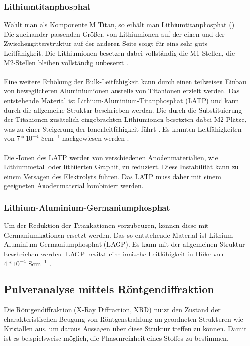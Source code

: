 \documentclass[a4paper, 11pt, headsepline,footsepline,twoside,abstract]{scrbook}
\begin{document}
\subsubsection{Lithiumtitanphosphat}
Wählt man als Komponente M Titan, so erhält man Lithiumtitanphosphat (). Die zueinander passenden Größen von Lithiumionen auf der einen und der Zwischengitterstruktur auf der anderen Seite sorgt für eine sehr gute Leitfähigkeit. Die Lithiumionen besetzen dabei vollständig die M1-Stellen, die M2-Stellen bleiben vollständig unbesetzt \cite{cao2014recent}. 
\\\\
Eine weitere Erhöhung der Bulk-Leitfähigkeit kann durch einen teilweisen Einbau von beweglicheren Aluminiumionen anstelle von Titanionen erzielt werden. Das entstehende Material ist Lithium-Aluminium-Titanphosphat (LATP) und kann durch die allgemeine Struktur  beschrieben werden. Die durch die Substituierung der Titanionen zusätzlich eingebrachten Lithiumionen besetzten dabei M2-Plätze, was zu einer Steigerung der Ionenleitfähigkeit führt \cite{aono1991electrical}. Es konnten Leitfähigkeiten von $7*10^{-4}$ Scm$^{-1}$ nachgewiesen werden \cite{aono1990ionic}. 
\\\\
Die -Ionen des LATP werden von verschiedenen Anodenmaterialien, wie Lithiummetall oder lithiierten Graphit, zu  reduziert. Diese Instabilität kann zu einem Versagen des Elektrolyts führen. Das LATP muss daher mit einem geeigneten Anodenmaterial kombiniert werden.
\subsubsection{Lithium-Aluminium-Germaniumphosphat}
Um der Reduktion der Titankationen vorzubeugen, können diese mit Germaniumkationen ersetzt werden. Das so entstehende Material ist Lithium-Aluminium-Germaniumphosphat (LAGP). Es kann mit der allgemeinen Struktur  beschrieben werden. LAGP besitzt eine ionische Leitfähigkeit in Höhe von $4*10^{-4}$ Scm$^{-1}$ \cite{fu1997fast}.
\subsection{Pulveranalyse mittels Röntgendiffraktion}
Die Röntgendiffraktion (X-Ray Diffraction, XRD) nutzt den Zustand der charakteristischen Beugung von Röntgenstrahlung an geordneten Strukturen wie Kristallen aus, um daraus Aussagen über diese Struktur treffen zu können. Damit ist es beispielsweise möglich, die Phasenreinheit eines Stoffes zu bestimmen.
\end{document}
